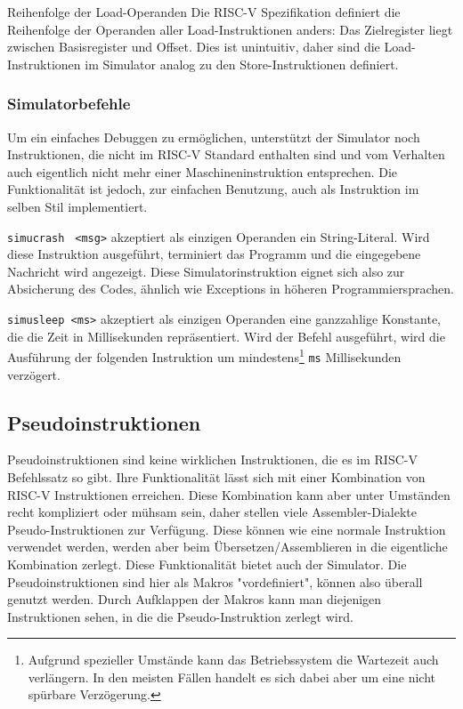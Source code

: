 \begin{infoblock}{Reihenfolge der Load-Operanden}
Die RISC-V Spezifikation definiert die Reihenfolge der Operanden aller
Load-Instruktionen anders: Das Zielregister liegt zwischen Basisregister und
Offset. Dies ist unintuitiv, daher sind die Load-Instruktionen im Simulator
analog zu den Store-Instruktionen definiert.
\end{infoblock}
\vspace{-0.2cm}
\subsubsection{Simulatorbefehle}

Um ein einfaches Debuggen zu ermöglichen, unterstützt der Simulator noch
Instruktionen, die nicht im RISC-V Standard enthalten sind und vom Verhalten
auch eigentlich nicht mehr einer Maschineninstruktion entsprechen. Die
Funktionalität ist jedoch, zur einfachen Benutzung, auch als Instruktion im
selben Stil implementiert.

\texttt{simucrash } \texttt{<msg>} akzeptiert als einzigen Operanden ein
String-Literal. Wird diese Instruktion ausgeführt, terminiert das Programm und
die eingegebene Nachricht wird angezeigt. Diese Simulatorinstruktion eignet sich
also zur Absicherung des Codes, ähnlich wie Exceptions in höheren
Programmiersprachen.

\texttt{simusleep }\texttt{<ms>} akzeptiert als einzigen Operanden eine
ganzzahlige Konstante, die die Zeit in Millisekunden repräsentiert. Wird der
Befehl ausgeführt, wird die Ausführung der folgenden Instruktion um
mindestens\footnote{Aufgrund spezieller Umstände kann das Betriebssystem die
Wartezeit auch verlängern. In den meisten Fällen handelt es sich dabei aber
um eine nicht spürbare Verzögerung.} \texttt{ms} Millisekunden verzögert.

\subsection{Pseudoinstruktionen}
\label{user-manual-riscv-overview-pseudos}

Pseudoinstruktionen sind keine wirklichen Instruktionen, die es im RISC-V
Befehlssatz so gibt. Ihre Funktionalität lässt sich mit einer Kombination von
RISC-V Instruktionen erreichen. Diese Kombination kann aber unter Umständen
recht kompliziert oder mühsam sein, daher stellen viele Assembler-Dialekte
Pseudo-Instruktionen zur Verfügung. Diese können wie eine normale Instruktion
verwendet werden, werden aber beim Übersetzen/Assemblieren in die eigentliche
Kombination zerlegt. Diese Funktionalität bietet auch der Simulator. Die
Pseudoinstruktionen sind hier als Makros "vordefiniert", können also überall
genutzt werden. Durch Aufklappen der Makros kann man diejenigen Instruktionen
sehen, in die die Pseudo-Instruktion zerlegt wird.

